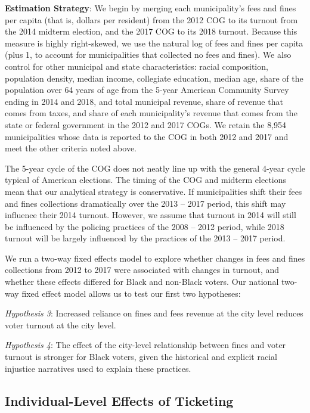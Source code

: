 \documentclass[
  12pt,
]{article}
\begin{document}
\textbf{Estimation Strategy}: We begin by merging each municipality's fees and fines per capita (that is, dollars per resident) from the 2012 COG to its turnout from the 2014 midterm election, and the 2017 COG to its 2018 turnout. Because this measure is highly right-skewed, we use the natural log of fees and fines per capita (plus 1, to account for municipalities that collected no fees and fines). We also control for other municipal and state characteristics: racial composition, population density, median income, collegiate education, median age, share of the population over 64 years of age from the 5-year American Community Survey ending in 2014 and 2018, and total municipal revenue, share of revenue that comes from taxes, and share of each municipality's revenue that comes from the state or federal government in the 2012 and 2017 COGs. We retain the 8,954 municipalities whose data is reported to the COG in both 2012 and 2017 and meet the other criteria noted above.

The 5-year cycle of the COG does not neatly line up with the general 4-year cycle typical of American elections. The timing of the COG and midterm elections mean that our analytical strategy is conservative. If municipalities shift their fees and fines collections dramatically over the 2013 -- 2017 period, this shift may influence their 2014 turnout. However, we assume that turnout in 2014 will still be influenced by the policing practices of the 2008 -- 2012 period, while 2018 turnout will be largely influenced by the practices of the 2013 -- 2017 period.

We run a two-way fixed effects model to explore whether changes in fees and fines collections from 2012 to 2017 were associated with changes in turnout, and whether these effects differed for Black and non-Black voters. Our national two-way fixed effect model allows us to test our first two hypotheses:

\emph{Hypothesis 3}: Increased reliance on fines and fees revenue at the city level reduces voter turnout at the city level.

\emph{Hypothesis 4}: The effect of the city-level relationship between fines and voter turnout is stronger for Black voters, given the historical and explicit racial injustice narratives used to explain these practices.

\hypertarget{individual-level-effects-of-ticketing}{%
\subsection*{Individual-Level Effects of Ticketing}\label{individual-level-effects-of-ticketing}}
\end{document}
